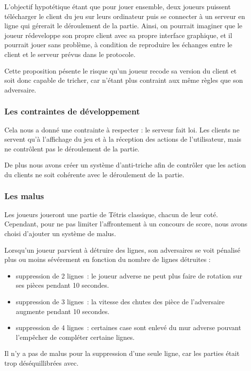 \documentclass[a4paper, 12pt]{article}
\begin{document}
			L'objectif hypotétique étant que pour jouer ensemble, deux joueurs puissent télécharger le client du jeu sur leurs ordinateur puis se connecter à un serveur en ligne qui gérerait le déroulement de la partie. 
			Ainsi, on pourrait imaginer que le joueur rédeveloppe son propre client avec sa propre interface graphique, et il pourrait jouer sans problème, à condition de reproduire les échanges entre le client et le serveur prévus dans le protocole.

			Cette proposition pésente le risque qu'un joueur recode sa version du client et soit donc capable de tricher, car n'étant plus contraint aux même règles que son adversaire.

		\subsubsection{Les contraintes de développement}
			Cela nous a donné une contrainte à respecter : le serveur fait loi. Les clients ne servent qu'à l'affichage du jeu et à la réception des actions de l'utilisateur, mais ne contrôlent pas le déroulement de la partie.

			De plus nous avons créer un système d'anti-triche afin de contrôler que les action du clients ne soit cohérente avec le déroulement de la partie.

		\subsubsection{Les malus}
			Les joueurs joueront une partie de Tétris classique, chacun de leur coté. Cependant, pour ne pas limiter l'affrontement à un concours de score, nous avons choisi d'ajouter un système de malus.

			Lorsqu'un joueur parvient à détruire des lignes, son adversaires se voit pénalisé plus ou moins sévérement en fonction du nombre de lignes détruites :
			\begin{itemize}
				\item suppression de 2 lignes : le joueur adverse ne peut plus faire de rotation sur ses pièces pendant 10 secondes.
				\item suppression de 3 lignes : la vitesse des chutes des pièce de l’adversaire augmente pendant 10 secondes.
				\item suppression de 4 lignes : certaines case sont enlevé du mur adverse pouvant l’empêcher de compléter certaine lignes.
			\end{itemize}

			Il n'y a pas de malus pour la suppression d'une seule ligne, car les parties était trop déséquillibrées avec.
\end{document}
